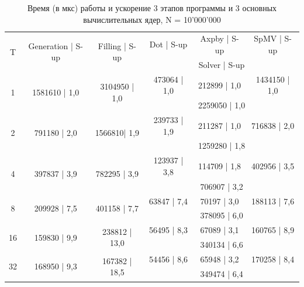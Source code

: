 		\begin{table}[H]
			\begin{tabular}{|c||c|c|c|c|c|}
				\hline
				\multirow{2}{*}{T} &  \multirow{2}{*}{Generation | S-up} & \multirow{2}{*}{Filling | S-up} & Dot | S-up & Axpby | S-up & SpMV | S-up \\ \cline{4-6}
				                   &                              &                         & \multicolumn{3}{c|}{Solver | S-up} \\ \hline
                \multirow{2}{*}{1} & \multirow{2}{*}{1581610 | 1,0} & \multirow{2}{*}{3104950 | 1,0} & 473064 | 1,0 & 212899 | 1,0 & 1434150 | 1,0 \\ \cline{4-6}
                                   &                   &                   & \multicolumn{3}{c|}{2259050 | 1,0}   \\ \hline
                \multirow{2}{*}{2} & \multirow{2}{*}{791180 | 2,0} & \multirow{2}{*}{1566810| 1,9} & 239733 | 1,9 & 211287 | 1,0& 716838 | 2,0 \\ \cline{4-6}
                                   &                   &                   & \multicolumn{3}{c|}{1259280 | 1,8}   \\ \hline
                \multirow{2}{*}{4} & \multirow{2}{*}{397837 | 3,9} & \multirow{2}{*}{782295 | 3,9} & 123937 | 3,8& 114709 | 1,8& 402956 | 3,5 \\ \cline{4-6}
                                   &                   &                   & \multicolumn{3}{c|}{706907 | 3,2}   \\ \hline
                \multirow{2}{*}{8} & \multirow{2}{*}{209928 | 7,5} & \multirow{2}{*}{401158 | 7,7} & 63847 | 7,4& 70197 | 3,0& 188113 |  7,6\\ \cline{4-6}
                                   &                   &                   & \multicolumn{3}{c|}{378095 | 6,0}   \\ \hline
                \multirow{2}{*}{16} & \multirow{2}{*}{159830 | 9,9} & \multirow{2}{*}{238812 | 13,0} & 56495 | 8,3& 67089 | 3,1& 160765 |  8,9\\ \cline{4-6}
                                   &                   &                   & \multicolumn{3}{c|}{340134 | 6,6}   \\ \hline
                \multirow{2}{*}{32} & \multirow{2}{*}{168950 | 9,3} & \multirow{2}{*}{167382 | 18,5} & 54456 | 8,6& 65948 | 3,2& 170258 |  8,4\\ \cline{4-6}
                                   &                   &                   & \multicolumn{3}{c|}{349474 | 6,4}   \\ \hline

			\end{tabular}
			\caption{Время (в мкс) работы и ускорение 3 этапов программы и 3 основных вычислительных ядер, N = 10'000'000}
			\label{par_2}
		\end{table}
